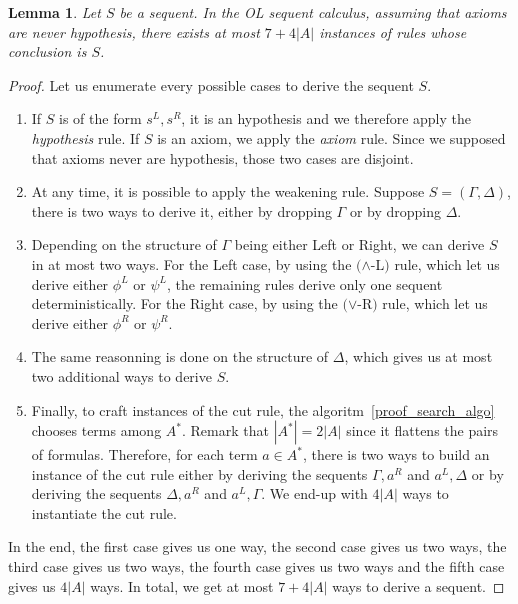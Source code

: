 \documentclass[a4paper, 11pt]{article}
\newtheorem{lemma}[theorem]{Lemma}
\begin{document}
    \begin{lemma}\label{lemma_hyperedges_branching}
	    Let $S$ be a sequent. In the OL sequent calculus, assuming that axioms are never hypothesis, 
	    there exists at most $7+4|A|$ instances of rules whose conclusion is $S$.
    \end{lemma}
    \begin{proof}
	    Let us enumerate every possible cases to derive the sequent $S$.
	    \begin{enumerate}
		    \item
			    If $S$ is of the form $s^L,s^R$, it is an hypothesis and we therefore
			    apply the \textit{hypothesis} rule. If $S$ is an axiom, we apply the 
			    \textit{axiom} rule. Since
			    we supposed that axioms never are hypothesis, those two cases are
			    disjoint.
		    \item
			    At any time, it is possible to apply the weakening rule. Suppose
			    $S=(\Gamma,\Delta)$, there is two ways to derive it, either by dropping
			    $\Gamma$ or by dropping $\Delta$.
		    \item
			    Depending on the structure of $\Gamma$ being either Left or Right, we
			    can derive $S$ in at most two ways. For the Left case, by using the
			    $(\wedge$-L$)$ rule, which let us derive either $\phi^L$ or $\psi^L$, the
			    remaining rules derive only one sequent deterministically. For the Right
			    case, by using the $(\vee$-R$)$ rule, which let us derive either $\phi^R$
			    or $\psi^R$.
		    \item
			    The same reasonning is done on the structure of $\Delta$, which gives us
			    at most two additional ways to derive $S$.
		    \item
			    Finally, to craft instances of the cut rule, 
			    the algoritm~\ref{proof_search_algo} chooses terms among $A^*$. Remark
			    that $|A^*|=2|A|$ since it flattens the pairs of formulas. Therefore, for 
			    each term $a\in A^*$, there is two ways to build an instance of the cut
			    rule either by deriving the sequents $\Gamma,a^R$ and $a^L,\Delta$ or by
			    deriving the sequents $\Delta,a^R$ and $a^L,\Gamma$.
			    We end-up with $4|A|$ ways to instantiate the cut rule.
	    \end{enumerate}
	    In the end, the first case gives us one way, the second case gives us two ways, the third
	    case gives us two ways, the fourth case gives us two ways and the fifth case gives us
	    $4|A|$ ways. In total, we get at most $7+4|A|$ ways to derive a sequent.
    \end{proof}
\end{document}
